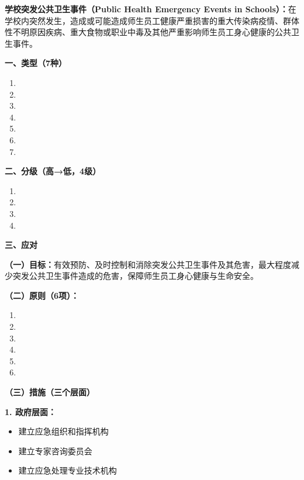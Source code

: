 \begin{keybox}
\textbf{学校突发公共卫生事件（Public Health Emergency Events in Schools）：}在学校内突然发生，造成或可能造成师生员工健康严重损害的重大传染病疫情、群体性不明原因疾病、重大食物或职业中毒及其他严重影响师生员工身心健康的公共卫生事件。

\textbf{一、类型（7种）}

\begin{enumerate}[leftmargin=*]
    \item {}
    \item {}
    \item {}
    \item {}
    \item {}
    \item {}
    \item {}
\end{enumerate}

\textbf{二、分级（高→低，4级）}

\begin{enumerate}[leftmargin=*]
    \item {}
    \item {}
    \item {}
    \item {}
\end{enumerate}

\textbf{三、应对}

\textbf{（一）目标：}有效预防、及时控制和消除突发公共卫生事件及其危害，最大程度减少突发公共卫生事件造成的危害，保障师生员工身心健康与生命安全。

\textbf{（二）原则（6项）：}
\begin{enumerate}[leftmargin=*]
    \item {}
    \item {}
    \item {}
    \item {}
    \item {}
    \item {}
\end{enumerate}

\textbf{（三）措施（三个层面）}

\textbf{1. 政府层面：}
\begin{itemize}[leftmargin=*]
    \item 建立应急组织和指挥机构
    \item 建立专家咨询委员会
    \item 建立应急处理专业技术机构
\end{itemize}


\end{keybox}
